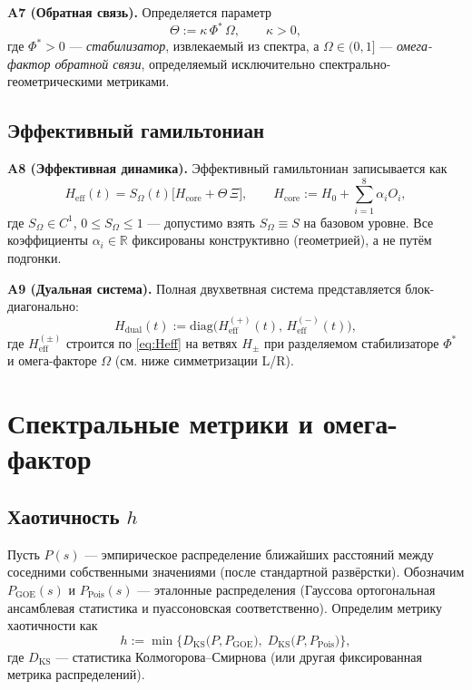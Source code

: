 \documentclass[a4paper,12pt]{article}
\begin{document}
\textbf{A7 (Обратная связь).}
Определяется параметр
\begin{equation}
\Theta := \kappa\,\Phi^\ast\,\Omega, \qquad \kappa>0,
\end{equation}
где $\Phi^\ast>0$ --- \emph{стабилизатор}, извлекаемый из спектра, а $\Omega\in(0,1]$ --- \emph{омега-фактор обратной связи}, определяемый исключительно спектрально-геометрическими метриками.

\subsection*{Эффективный гамильтониан}
\textbf{A8 (Эффективная динамика).}
Эффективный гамильтониан записывается как
\begin{equation}\label{eq:Heff}
H_{\mathrm{eff}}(t) = S_\Omega(t)\Big[ H_{\mathrm{core}} + \Theta\,\Xi \Big], \qquad
H_{\mathrm{core}} := H_0 + \sum_{i=1}^8 \alpha_i O_i,
\end{equation}
где $S_\Omega\in C^1$, $0\le S_\Omega\le 1$ --- допустимо взять $S_\Omega\equiv S$ на базовом уровне.
Все коэффициенты $\alpha_i\in\mathbb{R}$ фиксированы конструктивно (геометрией), а не путём подгонки.

\textbf{A9 (Дуальная система).}
Полная двухветвная система представляется блок-диагонально:
\begin{equation}
H_{\mathrm{dual}}(t) := \mathrm{diag}\big(H_{\mathrm{eff}}^{(+)}(t),\, H_{\mathrm{eff}}^{(-)}(t)\big),
\end{equation}
где $H_{\mathrm{eff}}^{(\pm)}$ строится по \eqref{eq:Heff} на ветвях $H_\pm$ при разделяемом стабилизаторе $\Phi^\ast$ и омега-факторе $\Omega$ (см. ниже симметризации L/R).

\section{Спектральные метрики и омега-фактор}
\subsection*{Хаотичность $h$}
Пусть $P(s)$ --- эмпирическое распределение ближайших расстояний между соседними собственными значениями (после стандартной развёрстки).
Обозначим $P_{\mathrm{GOE}}(s)$ и $P_{\mathrm{Pois}}(s)$ --- эталонные распределения (Гауссова ортогональная ансамблевая статистика и пуассоновская соответственно).
Определим метрику хаотичности как
\begin{equation}
h := \min\Big\{ D_{\mathrm{KS}}\big(P, P_{\mathrm{GOE}}\big),\; D_{\mathrm{KS}}\big(P, P_{\mathrm{Pois}}\big) \Big\},
\end{equation}
где $D_{\mathrm{KS}}$ --- статистика Колмогорова--Смирнова (или другая фиксированная метрика распределений).
\end{document}
